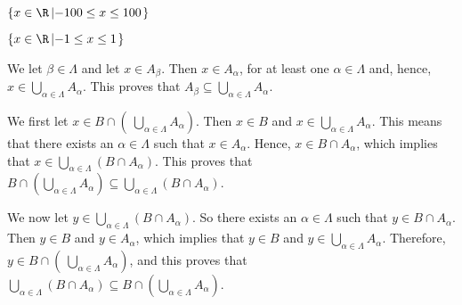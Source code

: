 \begin{multicols}{2}
\begin{list}{\bf{\ref{exer:indexpositivereals}.}}
\item \begin{list}{\bf{(a)}}
\item $\left\{ x \in \R \left| -100 \leq x \leq 100 \right. \right\}$
\end{list}
\end{list}

\begin{list}{}
\item \begin{list}{\bf{(b)}}
\item $\left\{ x \in \R \left| -1 \leq x \leq 1 \right. \right\}$
\end{list}
\end{list}
\end{multicols}



\begin{list}{\bf{\ref{exer:indexproperties}.}}
\item \begin{list}{\bf{(a)}}
\item We let $\beta \in \Lambda$ and let $x \in A_\beta$.  Then $x \in A_\alpha$, for at least one 
$\alpha \in \Lambda$ and, hence, 
$x \in \bigcup\limits_{\alpha \in \Lambda}^{}A_\alpha$.  This proves that 
$A_\beta \subseteq \bigcup\limits_{\alpha \in \Lambda}^{}A_\alpha$.
\end{list}
\end{list}


\begin{list}{\bf{\ref{exer:distributeindex}.}}
\item \begin{list}{\bf{(a)}}
\item We first let 
$x \in B \cap \left(\:\bigcup\limits_{\alpha \in \Lambda}^{}A_{\alpha} \right)$.  Then $x \in B$ and $x \in \bigcup\limits_{\alpha \in \Lambda}^{}A_{\alpha} $.  This means that there exists an $\alpha \in \Lambda$ such that $x \in A_\alpha$.  Hence, 
$x \in B \cap A_\alpha$, which implies that 
$x \in \bigcup\limits_{\alpha \in \Lambda}^{} \left( B \cap A_{\alpha} \right)$.  This proves that 
$B \cap \left(\bigcup\limits_{\alpha \in \Lambda}^{}A_{\alpha} \right) 
\subseteq \bigcup\limits_{\alpha \in \Lambda}^{} \left( B \cap A_{\alpha} \right)$.
 
We now let 
$y \in \bigcup\limits_{\alpha \in \Lambda}^{} \left( B \cap A_{\alpha} \right)$.  So there exists an $\alpha \in \Lambda$ such that $y \in B \cap A_{\alpha}$.  Then $y \in B$ and 
$y \in A_{\alpha}$, which implies that $y \in B$ and  
$y \in \bigcup\limits_{\alpha \in \Lambda}^{}A_{\alpha}$.  Therefore, 
$y \in B \cap \left(\:\bigcup\limits_{\alpha \in \Lambda}^{}A_{\alpha} \right)$, and this proves that 
$\bigcup\limits_{\alpha \in \Lambda}^{} \left( B \cap A_{\alpha} \right) \subseteq B \cap \left(\bigcup\limits_{\alpha \in \Lambda}^{}A_{\alpha} \right)$.
\end{list}
\end{list}




